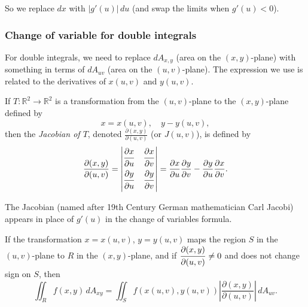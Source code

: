   So we replace $dx$ with $\left|g'(u)\right|\, du$ (and swap the limits when $g'(u) < 0$).

  \subsubsection*{Change of variable for double integrals}

  For double integrals, we need to replace $dA_{x, y}$ (area on the $(x, y)$-plane) with something in terms of $dA_{uv}$ (area on the $(u, v)$-plane).  The expression we use is related to the derivatives of $x(u, v)$ and $y(u, v)$.

  \begin{definition}
    If $T \colon \mathbb{R}^2 \rightarrow \mathbb{R}^2$ is a transformation from the $(u, v)$-plane to the $(x, y)$-plane defined by
    \[
      x = x(u, v), \quad y - y(u, v),
    \]
    then the \emph{Jacobian of $T$}, denoted $\displaystyle{\frac{\partial(x, y)}{\partial(u, v)}}$ (or $J(u, v)$), is defined by
    \[
      \frac{\partial(x, y)}{\partial(u, v)} = \left|
      \begin{matrix}
        \dfrac{\strut\partial x}{\strut\partial u} & \dfrac{\strut\partial x}{\strut\partial v}  \\
        \dfrac{\strut\partial y}{\strut\partial u} & \dfrac{\strut\partial y}{\strut\partial v}
      \end{matrix}
      \right| = \frac{\partial x}{\partial u}\frac{\partial y}{\partial v} - \frac{\partial y}{\partial u}\frac{\partial x}{\partial v}.
    \]
  \end{definition}

  The Jacobian (named after 19th Century German mathematician Carl Jacobi) appears in place of $g'(u)$ in the change of variables formula.

  \begin{theorem}
    If the transformation $x = x(u, v)$, $y = y(u, v)$ maps the region $S$ in the $(u, v)$-plane to $R$ in the $(x, y)$-plane, and if $\displaystyle{\frac{\strut\partial(x, y)}{\strut\partial(u, v)}} \neq 0$ and does not change sign on $S$, then
      \[
        \iint_R f(x, y) \, dA_{xy} = \iint_S f(x(u, v), y(u, v)) \left|\displaystyle{\frac{\partial(x, y)}{\partial(u, v)}}\right| \, dA_{uv}.
      \]
  \end{theorem}

